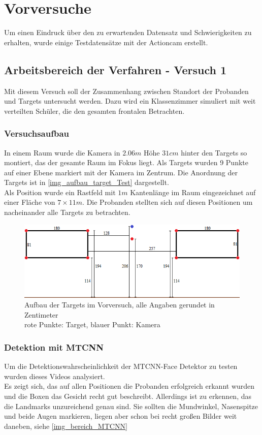\section{Vorversuche}
Um einen Eindruck über den zu erwartenden Datensatz und Schwierigkeiten zu erhalten, wurde einige Testdatensätze mit der Actioncam erstellt.\\
\subsection{Arbeitsbereich der Verfahren - Versuch 1}
Mit diesem Versuch soll der Zusammenhang zwischen Standort der Probanden und Targets untersucht werden. Dazu wird ein Klassenzimmer simuliert mit weit verteilten Schüler, die den gesamten frontalen Betrachten.
\subsubsection{Versuchsaufbau}
In einem Raum wurde die Kamera in $2.06m$ Höhe $31cm$ hinter den Targets so montiert, das der gesamte Raum im Fokus liegt. Als Targets wurden 9 Punkte auf einer Ebene markiert mit der Kamera im Zentrum. Die Anordnung der Targets ist in \autoref{img_aufbau_target_Test} dargestellt.\\
Als Position wurde ein Rastfeld mit $1m$ Kantenlänge im Raum eingezeichnet auf einer Fläche von $7 \times 11m$. Die Probanden stellten sich auf diesen Positionen um nacheinander alle Targets zu betrachten. 
\begin{figure}
	\centering
	\includegraphics[width=0.7\linewidth]{PositionWinkel/Target}
	\caption{Aufbau der Targets im Vorversuch, alle Angaben gerundet in Zentimeter\\rote Punkte: Target, blauer Punkt: Kamera}
	\label{img_aufbau_target_Test}
\end{figure}
\subsubsection{Detektion mit MTCNN}
Um die Detektionswahrscheinlichkeit der MTCNN-Face Detektor zu testen wurden dieses Videos analysiert.\\
Es zeigt sich, das auf allen Positionen die Probanden erfolgreich erkannt wurden und die Boxen das Gesicht recht gut beschreibt. Allerdings ist zu erkennen, das die Landmarks unzureichend genau sind. Sie sollten die Mundwinkel, Nasenspitze und beide Augen markieren, liegen aber schon bei recht großen Bilder weit daneben, siehe \autoref{img_bereich_MTCNN}
